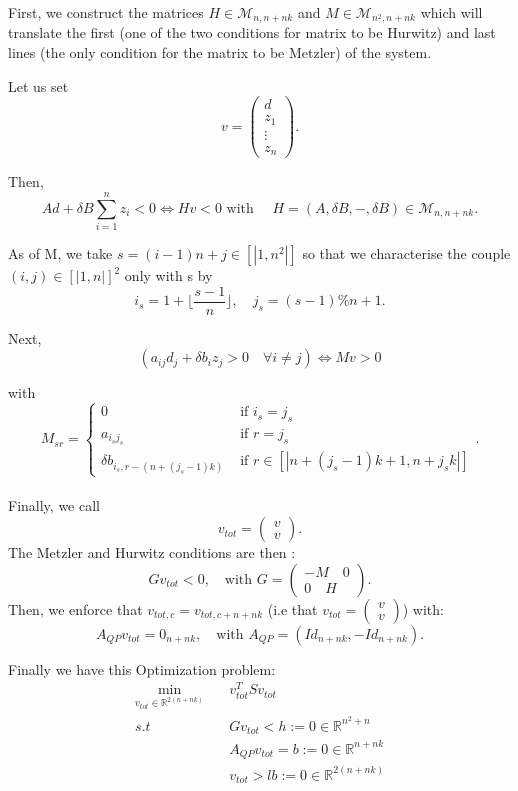 \documentclass[12pt]{article}
\begin{document}
First, we construct the matrices $H \in \mathcal{M}_{n,n+nk}$ and $M \in \mathcal{M}_{n^2,n+nk}$ which will translate the first (one of the two conditions for matrix to be Hurwitz) and last lines (the only condition for the matrix to be Metzler) of the system. 

 Let us set $$v=\begin{pmatrix}d\\ z_1 \\ \vdots \\ z_n
\end{pmatrix}.$$

Then, 
$$Ad + \delta B\sum_{i=1}^n z_i <0 \Leftrightarrow H
v
<0 \text{ with } \quad H = (A,\delta B,-,\delta B) \in \mathcal{M}_{n,n+nk}.$$

As of M, we take $s = (i-1)n + j \in [|1,n^2|]$ so that we characterise the couple $(i,j) \in [|1,n|]^2$ only with s by
$$i_s = 1+\lfloor\frac{s-1}{n}\rfloor, \quad j_s=(s-1)\%n+1.$$

Next, $$(a_{ij}d_j+\delta b_iz_j >0 \quad \forall i \neq j )\Leftrightarrow Mv > 0$$

with
$$M_{sr} = 
\left\{ \begin{aligned}
0 &\text{ if } i_s=j_s \\
a_{i_s j_s} &\text{ if } r=j_s\\
\delta b_{i_s,r-(n+(j_s-1)k)} &\text{ if } r\in [|n+(j_s-1)k+1, n+j_sk|]
\end{aligned}\right. .$$
\\

Finally, we call $$v_{tot} = \begin{pmatrix}v\\v\end{pmatrix}.$$
The Metzler and Hurwitz conditions are then : $$Gv_{tot} <0, \quad \text{with }G = \begin{pmatrix}-M\quad 0 \\ 0 \quad H\end{pmatrix}.$$Then, we enforce that $v_{tot, c} = v_{tot, c+n+nk}$ (i.e that $v_{tot} = \begin{pmatrix}v\\v\end{pmatrix}$) with: $$A_{QP}v_{tot} = 0_{n+nk},\quad \text{with } A_{QP}= (Id_{n+nk},-Id_{n+nk}).$$


Finally we have this Optimization problem: 
\begin{equation}\label{opti_problem_pos_ctrl}
\begin{aligned}
\min_{v_{tot}\in \mathbb{R}^{2(n+nk)}}\quad &v_{tot}^TSv_{tot}\\
s.t \quad &Gv_{tot} <h:=0\in\mathbb{R}^{n^2+n} \\
&A_{QP}v_{tot}= b:=0 \in \mathbb{R}^{n+nk}\\
&v_{tot} > lb:=0 \in \mathbb{R}^{2(n+nk)}
\end{aligned}    
\end{equation}
\end{document}
